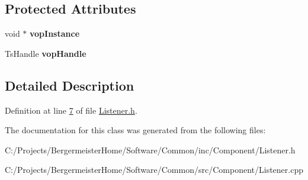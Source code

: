 \subsection*{Protected Attributes}
\begin{DoxyCompactItemize}
\item 
\mbox{\label{class_g_n_common_1_1_n_component_1_1_g_tc_listener_ad2f8b2b212ee0120ce41c8715abe68aa}} 
void $\ast$ {\bfseries vop\+Instance}
\item 
\mbox{\label{class_g_n_common_1_1_n_component_1_1_g_tc_listener_a0add5b70f2f2f400de4ab6442fe91595}} 
Ts\+Handle {\bfseries vop\+Handle}
\end{DoxyCompactItemize}


\subsection{Detailed Description}


Definition at line \mbox{\hyperlink{_listener_8h_source_l00007}{7}} of file \mbox{\hyperlink{_listener_8h_source}{Listener.\+h}}.



The documentation for this class was generated from the following files\+:\begin{DoxyCompactItemize}
\item 
C\+:/\+Projects/\+Bergermeister\+Home/\+Software/\+Common/inc/\+Component/Listener.\+h\item 
C\+:/\+Projects/\+Bergermeister\+Home/\+Software/\+Common/src/\+Component/Listener.\+cpp\end{DoxyCompactItemize}
